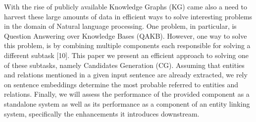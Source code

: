 With the rise of publicly available Knowledge Graphs (KG) came also a need to harvest these large amounts of data in efficient ways to solve interesting problems in the domain of 
Natural language processing. One problem, in particular, is Question Answering over Knowledge Bases (QAKB). However, one way to solve this problem, is by combining multiple 
components each responsible for solving a different subtask [10]. This paper we present an efficient approach to solving one of these subtasks, namely Candidates Generation (CG). 
Assuming that entities and relations mentioned in a given input sentence are already extracted, we rely on sentence embeddings determine the most probable referred to entities and 
relations. Finally, we will assess the performance of the provided component as a standalone system as well as its performance as a component of an entity linking system, specifically the enhancements it introduces downstream.